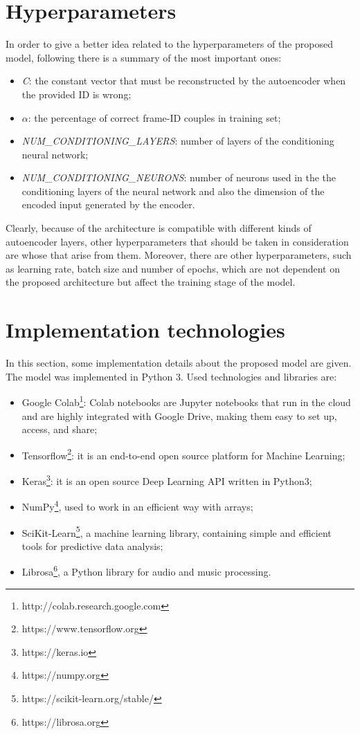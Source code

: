 \section{Hyperparameters}
In order to give a better idea related to the hyperparameters of the proposed model, following there is a summary of the most important ones:
\begin{itemize}
    \item {\textit{C}: the constant vector that must be reconstructed by the autoencoder when the provided ID is wrong;}
    \item {$\alpha$: the percentage of correct frame-ID couples in training set;}
    \item {\textit{NUM\_CONDITIONING\_LAYERS}: number of layers of the conditioning neural network;}
    \item {\textit{NUM\_CONDITIONING\_NEURONS}: number of neurons used in the the conditioning layers of the neural network and also the dimension of the encoded input generated by the encoder.}
\end{itemize}
Clearly, because of the architecture is compatible with different kinds of autoencoder layers, other hyperparameters that should be taken in consideration are whose that arise from them. Moreover, there are other hyperparameters, such as learning rate, batch size and number of epochs, which are not dependent on the proposed architecture but affect the training stage of the model.
\section{Implementation technologies}
In this section, some implementation details about the proposed model are given. The model was implemented in Python 3. Used technologies and libraries are:
\begin{itemize}
    \item {Google Colab\footnote{http://colab.research.google.com}: Colab notebooks are Jupyter notebooks that run in the cloud and are highly integrated with Google Drive, making them easy to set up, access, and share;}
    \item {Tensorflow\footnote{https://www.tensorflow.org}: it is an end-to-end open source platform for Machine Learning;}
    \item {Keras\footnote{https://keras.io}: it is an open source Deep Learning API written in Python3;}
    \item {NumPy\footnote{https://numpy.org}, used to work in an efficient way with arrays;}
    \item {SciKit-Learn\footnote{https://scikit-learn.org/stable/}, a machine learning library, containing simple and efficient tools for predictive data analysis;}
    \item {Librosa\footnote{https://librosa.org}, a Python library for audio and music processing.}
\end{itemize}

